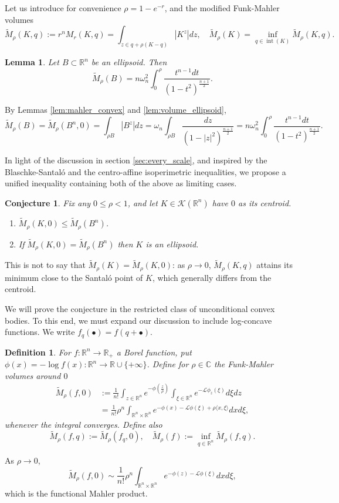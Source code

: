 \documentclass[reqno,10pt]{amsart}
\newtheorem{Definition}[Proposition]{Definition}
\newtheorem{Lemma}[Proposition]{Lemma}
\newtheorem{Conjecture}[Proposition]{Conjecture}
\DeclareMathOperator{\inter}{int}
\newcommand{\R}{\mathbb{R}}
\begin{document}
Let us introduce for convenience $\rho=1-e^{-r}$, and the modified Funk-Mahler volumes
$$\widetilde M_\rho(K,q):=r^nM_{r}(K,q)=\int_{z\in q+\rho (K-q)}|K^z|dz,\quad \widetilde M_\rho(K)=\inf_{q\in \inter(K)}\widetilde M_\rho(K, q).$$

\begin{Lemma}
	Let $B\subset\R^n$ be an ellipsoid. Then $$\widetilde M_\rho(B)=n\omega_n^2\int_0^\rho\frac{t^{n-1}dt}{(1-t^2)^{\frac{n+1}{2}}}.$$
\end{Lemma}
\proof By Lemmas \ref{lem:mahler_convex} and \ref{lem:volume_ellipsoid},
\[\widetilde M_\rho(B)=\widetilde M_\rho(B^n,0)=\int_{\rho B}|B^z|dz=\omega_n\int_{\rho B}\frac{dz}{(1-|z|^2)^{\frac{n+1}{2}}}=n\omega_n^2  \int_0^\rho\frac{t^{n-1}dt}{(1-t^2)^{\frac{n+1}{2}}}.\]
\endproof

In light of the discussion in section \ref{sec:every_scale}, and inspired by the Blaschke-Santal\'o and the centro-affine isoperimetric inequalities, we propose a unified inequality containing both of the above as limiting cases.
\begin{Conjecture}\label{conj:bodies}
	Fix any $0\leq \rho<1$, and let $K\in\mathcal K(\R^n)$ have $0$ as its centroid.
	\begin{enumerate}
		\item $\widetilde M_\rho(K,0)\leq \widetilde M_\rho(B^n)$.
		\item If $\widetilde M_\rho(K,0)= \widetilde M_\rho(B^n)$ then $K$ is an ellipsoid.
	\end{enumerate}
\end{Conjecture}
This is not to say that $\widetilde M_\rho(K)=\widetilde M_\rho(K,0)$: as $\rho\to 0$, $\widetilde M_\rho(K,q)$ attains its minimum close to the Santal\'o point of $K$, which generally differs from the centroid.

We will prove the conjecture in the restricted class of unconditional convex bodies. To this end, we must expand our discussion to include log-concave functions. We write $f_q(\bullet)=f(q+\bullet)$.

\begin{Definition}
	For $f:\R^n\to \R_+$ a Borel function, put $\phi(x)=-\log f(x):\R^n\to \R\cup\{+\infty\}$.  Define for $\rho\in\mathbb C$ the Funk-Mahler volumes around $0$
	\begin{align*}\widetilde M_\rho(f,0)&:=\frac{1}{n!}\displaystyle\int_{z\in\R^n} e^{-\phi(\frac{z}{\rho})}\displaystyle\int_{\xi\in \R^n} e^{-\mathcal L\phi_z(\xi)} d\xi dz\\&=\frac{1}{n!}\rho^n\displaystyle\int_{\R^n\times \R^n} e^{-\phi(x)-\mathcal L \phi (\xi)+\rho\langle x,\xi\rangle}dxd\xi,\end{align*}
	whenever the integral converges. Define also
	$$\widetilde M_\rho(f, q):=\widetilde M_\rho(f_q,0), \quad \widetilde M_\rho(f):=\inf_{q\in \R^n} \widetilde M_\rho(f, q).$$
\end{Definition}
As $\rho\to 0$, $$\widetilde M_\rho(f,0)\sim \frac 1{n!} \rho^n \int_{\R^n\times \R^n} e^{-\phi(z)-\mathcal L \phi(\xi)}dxd\xi,$$ which is the functional Mahler product.
\end{document}

